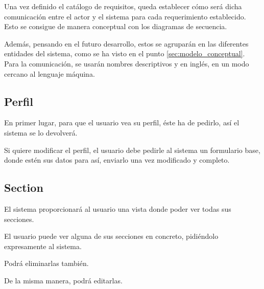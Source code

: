 Una vez definido el catálogo de requisitos, queda establecer cómo será dicha comunicación entre el actor y el sistema para cada requerimiento establecido. Esto se consigue de manera conceptual con los diagramas de secuencia.

Además, pensando en el futuro desarrollo, estos se agruparán en las diferentes entidades del sistema, como se ha visto en el punto \ref{sec:modelo_conceptual}. Para la comunicación, se usarán nombres descriptivos y en inglés, en un modo cercano al lenguaje máquina.

\subsection{Perfil}
En primer lugar, para que el usuario vea su perfil, éste ha de pedirlo, así el sistema se lo devolverá.


\newpage

Si quiere modificar el perfil, el usuario debe pedirle al sistema un formulario base, donde estén sus datos para así, enviarlo una vez modificado y completo.


\newpage

\subsection{Section}
El sistema proporcionará al usuario una vista donde poder ver todas sus secciones.


\newpage
El usuario puede ver alguna de sus secciones en concreto, pidiéndolo expresamente al sistema.


\newpage
Podrá eliminarlas también.


De la misma manera, podrá editarlas.

